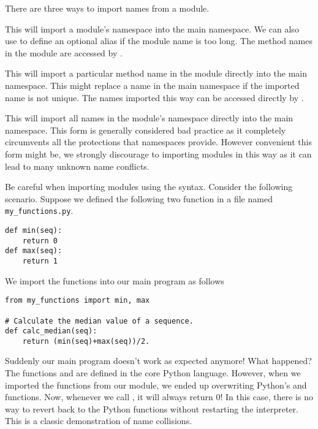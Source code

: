 There are three ways to import names from a module.
\begin{description}
\item {} This will import a module's namespace into the main namespace.
We can also use  to define an optional alias if the module name is too long.
The method names in the module are accessed by .
\item {} This will import a particular method name in the module directly into the main namespace.
This might replace a name in the main namespace if the imported name is not unique.
The names imported this way can be accessed directly by .
\item {} This will import all names in the module's namespace directly into the main namespace.
This form is generally considered bad practice as it completely circumvents all the protections that namespaces provide.
However convenient this form might be, we strongly discourage to importing modules in this way as it can lead to many unknown name conflicts.
\end{description}

\begin{warn}
Be careful when importing modules using the  syntax.
Consider the following scenario.
Suppose we defined the following two function in a file named \texttt{my\_functions.py}.
\begin{lstlisting}
def min(seq):
    return 0
def max(seq):
    return 1
\end{lstlisting}

We import the functions into our main program as follows
\begin{lstlisting}
from my_functions import min, max

# Calculate the median value of a sequence.
def calc_median(seq):
    return (min(seq)+max(seq))/2.
\end{lstlisting}

Suddenly our main program doesn't work as expected anymore!  What happened?
The functions  and  are defined in the core Python language.
However, when we imported the functions from our module, we ended up overwriting Python's  and  functions.
Now, whenever we call , it will always return 0!
In this case, there is no way to revert back to the Python functions without restarting the interpreter.
This is a classic demonstration of name collisions.
\end{warn}

